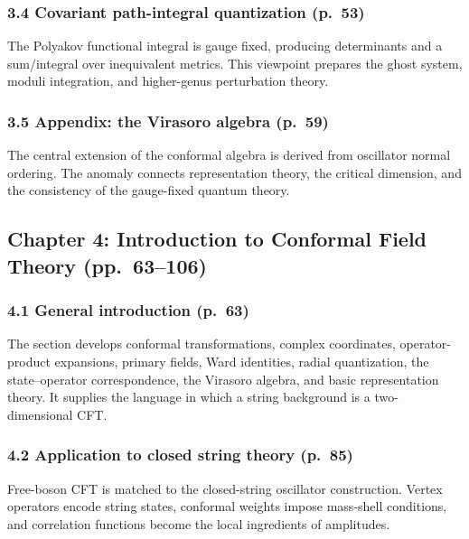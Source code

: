 \documentclass[
  10pt,
  a4paper,
  openany]{book}
\begin{document}
\subsubsection{3.4 Covariant path-integral quantization
(p.~53)}\label{covariant-path-integral-quantization-p.-53}

The Polyakov functional integral is gauge fixed, producing determinants
and a sum/integral over inequivalent metrics. This viewpoint prepares
the ghost system, moduli integration, and higher-genus perturbation
theory.

\subsubsection{3.5 Appendix: the Virasoro algebra
(p.~59)}\label{appendix-the-virasoro-algebra-p.-59}

The central extension of the conformal algebra is derived from
oscillator normal ordering. The anomaly connects representation theory,
the critical dimension, and the consistency of the gauge-fixed quantum
theory.

\subsection{Chapter 4: Introduction to Conformal Field Theory
(pp.~63--106)}\label{chapter-4-introduction-to-conformal-field-theory-pp.-63106}

\subsubsection{4.1 General introduction
(p.~63)}\label{general-introduction-p.-63}

The section develops conformal transformations, complex coordinates,
operator-product expansions, primary fields, Ward identities, radial
quantization, the state--operator correspondence, the Virasoro algebra,
and basic representation theory. It supplies the language in which a
string background is a two-dimensional CFT.

\subsubsection{4.2 Application to closed string theory
(p.~85)}\label{application-to-closed-string-theory-p.-85}

Free-boson CFT is matched to the closed-string oscillator construction.
Vertex operators encode string states, conformal weights impose
mass-shell conditions, and correlation functions become the local
ingredients of amplitudes.
\end{document}
